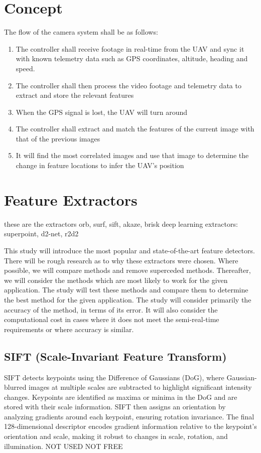 \section*{Concept}

The flow of the camera system shall be as follows:

\begin{enumerate}
    \item The controller shall receive footage in real-time from the UAV and sync it with known telemetry data such as GPS coordinates, altitude, heading and speed.
    \item The controller shall then process the video footage and telemetry data to extract and store the relevant features
    \item When the GPS signal is lost, the UAV will turn around
    \item The controller shall extract and match the features of the current image with that of the previous images
    \item It will find the most correlated images and use that image to determine the change in feature locations to infer the UAV's position
\end{enumerate}

\section*{Feature Extractors}
these are the extractors
orb, surf, sift, akaze, brisk
deep learning extractors: superpoint, d2-net, r2d2

This study will introduce the most popular and state-of-the-art feature detectors. There will be rough research as to why these extractors were chosen. Where possible, we will compare methods and remove superceded methods. Thereafter, we will consider the methods which are most likely to work for the given application. The study will test these methods and compare them to determine the best method for the given application. The study will consider primarily the accuracy of the method, in terms of its error. It will also consider the computational cost in cases where it does not meet the semi-real-time requirements or where accuracy is similar. 


\subsection*{SIFT (Scale-Invariant Feature Transform)}
SIFT detects keypoints using the Difference of Gaussians (DoG), where Gaussian-blurred images at multiple scales are subtracted to highlight significant intensity changes. Keypoints are identified as maxima or minima in the DoG and are stored with their scale information. SIFT then assigns an orientation by analyzing gradients around each keypoint, ensuring rotation invariance. The final 128-dimensional descriptor encodes gradient information relative to the keypoint’s orientation and scale, making it robust to changes in scale, rotation, and illumination.
NOT USED NOT FREE

